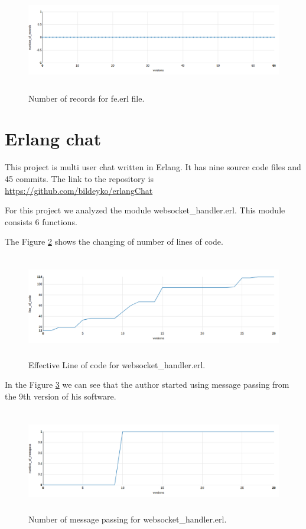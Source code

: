 \begin{figure}[h]
	\centering
	\includegraphics[height=45mm]{figures/number_of_records_iron.png}
	\caption{Number of records for fe.erl file.}
	\label{fig:number_of_records_iron}
\end{figure}

\section{Erlang chat }

This project is multi user chat written in Erlang. It has nine source code files and 45 commits. The link to the repository is \url{https://github.com/bildeyko/erlangChat}

For this project we analyzed the module websocket\_handler.erl. This module consists 6 functions.

The Figure \ref{fig:loc_chat} shows the changing of number of lines of code.

\begin{figure}[h]
	\centering
	\includegraphics[height=45mm]{figures/loc_chat.png}
	\caption{Effective Line of code for websocket\_handler.erl.}
	\label{fig:loc_chat}
\end{figure}

In the Figure \ref{fig:chat} we can see that the author started using message passing from the 9th version of his software.

\begin{figure}[h]
	\centering
	\includegraphics[height=45mm]{figures/chat.png}
	\caption{Number of message passing for websocket\_handler.erl.}
	\label{fig:chat}
\end{figure}

